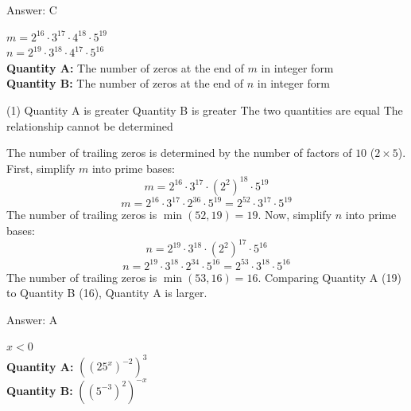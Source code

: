 \documentclass[11pt,paper=a4,answers]{exam}
\begin{document}
\begin{questions}
\begin{solution}
Answer: \colorbox{yellow!100}{C}
\end{solution}

\vspace{1cm}

\question
$m = 2^{16} \cdot 3^{17} \cdot 4^{18} \cdot 5^{19}$ \\
$n = 2^{19} \cdot 3^{18} \cdot 4^{17} \cdot 5^{16}$
\\[0.3cm]
\textbf{Quantity A: } The number of zeros at the end of $m$ in integer form \\
\textbf{Quantity B: } The number of zeros at the end of $n$ in integer form

\begin{tasks}(1)
\task[A)] Quantity A is greater
\task[B)] Quantity B is greater
\task[C)] The two quantities are equal
\task[D)] The relationship cannot be determined
\end{tasks}

\begin{solution}
The number of trailing zeros is determined by the number of factors of $10$ ($2 \times 5$).
\vspace{5pt}
First, simplify $m$ into prime bases:
\vspace{5pt}
\[ m = 2^{16} \cdot 3^{17} \cdot (2^2)^{18} \cdot 5^{19} \]
\vspace{5pt}
\[ m = 2^{16} \cdot 3^{17} \cdot 2^{36} \cdot 5^{19} = 2^{52} \cdot 3^{17} \cdot 5^{19} \]
\vspace{5pt}
The number of trailing zeros is $\min(52, 19) = 19$.
\vspace{5pt}
Now, simplify $n$ into prime bases:
\vspace{5pt}
\[ n = 2^{19} \cdot 3^{18} \cdot (2^2)^{17} \cdot 5^{16} \]
\vspace{5pt}
\[ n = 2^{19} \cdot 3^{18} \cdot 2^{34} \cdot 5^{16} = 2^{53} \cdot 3^{18} \cdot 5^{16} \]
\vspace{5pt}
The number of trailing zeros is $\min(53, 16) = 16$.
\vspace{5pt}
Comparing Quantity A (19) to Quantity B (16), Quantity A is larger.

Answer: \colorbox{yellow!100}{A}
\end{solution}

\vspace{1cm}

\question
$x < 0$
\\[0.3cm]
\textbf{Quantity A: } $((25^x)^{-2})^3$ \\
\textbf{Quantity B: } $((5^{-3})^2)^{-x}$


\end{questions}
\end{document}
